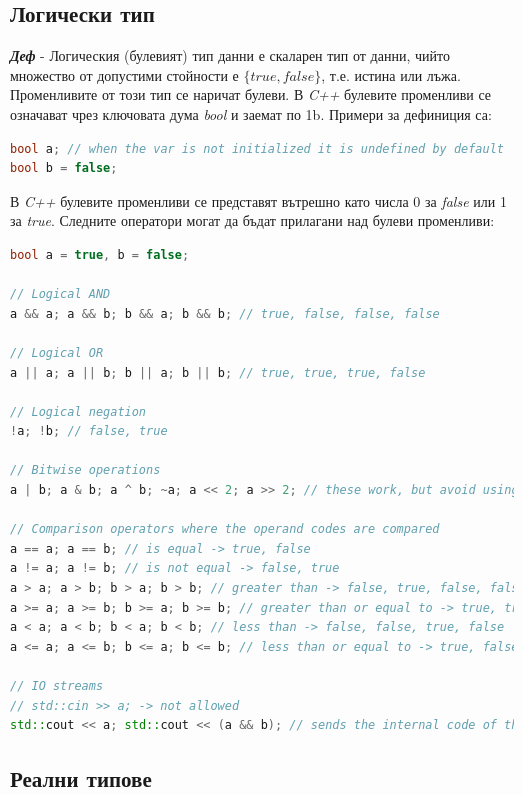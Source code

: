 \documentclass[fleqn,12pt]{article}
\begin{document}
\subsection{Логически тип}

\noindent \textit{\textbf{Деф}} - Логическия (булевият) тип данни е скаларен тип от данни, чийто множество от допустими стойности е $\{true, false\}$, т.е. истина или лъжа. 
Променливите от този тип се наричат булеви.
\bigbreak
В \textit{C++} булевите променливи се означават чрез ключовата дума \textit{bool} и заемат по 1b. Примери за дефиниция са:

\begin{lstlisting}[language=C++, caption=Bool variables]
bool a; // when the var is not initialized it is undefined by default
bool b = false;
\end{lstlisting}

В \textit{C++} булевите променливи се представят вътрешно като числа 0 за \textit{false} или 1 за \textit{true}.
Следните оператори могат да бъдат прилагани над булеви променливи:

\begin{lstlisting}[language=C++, caption=Bool operators]
bool a = true, b = false;

// Logical AND
a && a; a && b; b && a; b && b; // true, false, false, false

// Logical OR
a || a; a || b; b || a; b || b; // true, true, true, false

// Logical negation
!a; !b; // false, true

// Bitwise operations
a | b; a & b; a ^ b; ~a; a << 2; a >> 2; // these work, but avoid using - will cause confusion

// Comparison operators where the operand codes are compared
a == a; a == b; // is equal -> true, false
a != a; a != b; // is not equal -> false, true
a > a; a > b; b > a; b > b; // greater than -> false, true, false, false
a >= a; a >= b; b >= a; b >= b; // greater than or equal to -> true, true, false, true
a < a; a < b; b < a; b < b; // less than -> false, false, true, false
a <= a; a <= b; b <= a; b <= b; // less than or equal to -> true, false, true, true

// IO streams
// std::cin >> a; -> not allowed
std::cout << a; std::cout << (a && b); // sends the internal code of the boolean expression to the stdout fd -> 1, 0
\end{lstlisting}

\subsection{Реални типове}
\end{document}
